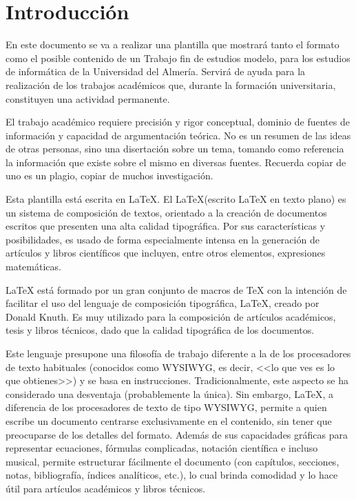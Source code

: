 \chapter {Introducción}
\label{sec:intro}


En este documento se va a realizar una plantilla que mostrará tanto el formato como el posible contenido de un Trabajo fin de estudios modelo, para los estudios de informática de la Universidad del Almería.
Servirá de  ayuda  para  la  realización  de  los trabajos  académicos  que,  durante  la  formación  universitaria,  constituyen  una  actividad  permanente.

El trabajo académico requiere precisión y rigor conceptual, dominio de fuentes de información y capacidad de argumentación teórica.  No es un  resumen de las ideas de otras personas, sino una disertación sobre un tema, tomando como referencia  la información  que existe sobre el  mismo en diversas fuentes. Recuerda copiar de uno es un plagio, copiar de muchos investigación. \cite{malaga}

Esta  plantilla está escrita en \LaTeX.
El \LaTeX (escrito LaTeX en texto plano) es un sistema de composición de textos, orientado a la creación de documentos escritos que presenten una alta calidad tipográfica. Por sus características y posibilidades, es usado de forma especialmente intensa en la generación de artículos y libros científicos que incluyen, entre otros elementos, expresiones matemáticas. \cite{wiki}

LaTeX está formado por un gran conjunto de macros de TeX con la intención de facilitar el uso del lenguaje de composición tipográfica,  \LaTeX, creado por Donald Knuth. Es muy utilizado para la composición de artículos académicos, tesis y libros técnicos, dado que la calidad tipográfica de los documentos. 

Este lenguaje presupone una filosofía de trabajo diferente a la de los procesadores de texto habituales (conocidos como WYSIWYG, es decir, <<lo que ves es lo que obtienes>>) y se basa en instrucciones. Tradicionalmente, este aspecto se ha considerado una desventaja (probablemente la única). Sin embargo, LaTeX, a diferencia de los procesadores de texto de tipo WYSIWYG, permite a quien escribe un documento centrarse exclusivamente en el contenido, sin tener que preocuparse de los detalles del formato. Además de sus capacidades gráficas para representar ecuaciones, fórmulas complicadas, notación científica e incluso musical, permite estructurar fácilmente el documento (con capítulos, secciones, notas, bibliografía, índices analíticos, etc.), lo cual brinda comodidad y lo hace útil para artículos académicos y libros técnicos.

